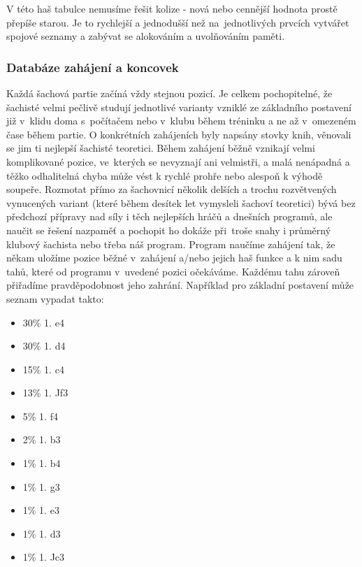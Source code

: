 \documentclass[11pt, titlepage]{article}
\begin{document}
V této haš tabulce nemusíme řešit kolize - nová nebo cennější hodnota prostě přepíše starou. Je to rychlejší a jednodušší než na~jednotlivých prvcích vytvářet spojové seznamy a zabývat se alokováním a uvolňováním paměti.

\subsubsection{Databáze zahájení a koncovek}

Každá šachová partie začíná vždy stejnou pozicí. Je celkem pochopitelné, že šachisté velmi pečlivě studují jednotlivé varianty vzniklé ze základního postavení již v~klidu doma s~počítačem nebo v~klubu během tréninku a ne až v~omezeném čase během partie. O konkrétních zahájeních byly napsány stovky knih, věnovali se jim ti nejlepší šachisté teoretici. Během zahájení běžně vznikají velmi komplikované pozice, ve~kterých se nevyznají ani velmistři, a malá nenápadná a těžko odhalitelná chyba může vést k rychlé prohře nebo alespoň k výhodě soupeře. Rozmotat přímo za šachovnicí několik delších a trochu rozvětvených vynucených variant (které během desítek let vymysleli šachoví teoretici) bývá bez předchozí přípravy nad síly i těch nejlepších hráčů a dnešních programů, ale naučit se řešení nazpaměť a pochopit ho dokáže při~troše snahy i průměrný klubový šachista nebo třeba náš program.
Program naučíme zahájení tak, že někam uložíme pozice běžné v~zahájení a/nebo jejich haš funkce a k nim sadu tahů, které od programu v~uvedené pozici očekáváme. Každému tahu zároveň přiřadíme pravděpodobnost jeho zahrání. Například pro základní postavení může seznam vypadat takto:
\begin{itemize}
	\item 30\% 1. e4
	\item 30\% 1. d4
	\item 15\% 1. c4
	\item 13\% 1. Jf3
	\item 5\% 1. f4
	\item 2\% 1. b3
	\item 1\% 1. b4
	\item 1\% 1. g3
	\item 1\% 1. e3
	\item 1\% 1. d3
	\item 1\% 1. Jc3
\end{itemize}
\end{document}
